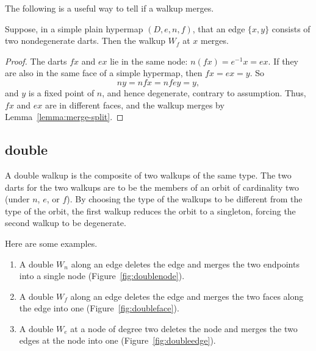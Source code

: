 \figILWHXTE %


The following is a useful way to tell if a walkup merges.


\begin{lemma}\label{lemma:ng-merge}  
Suppose, in a simple plain hypermap $(D,e,n,f)$, that an edge $\{x,y\}$ consists
of two nondegenerate darts.  Then the walkup $W_f$ 
at $x$ merges.
\end{lemma}
%

\begin{proof}
The darts $f x$ and $e x$ lie in the same node: $n (f x) = e^{-1} x
= e x$. If they are also in the same face of a simple hypermap, then
$f x = e x = y$. So
\[ n y = n f x = n f e y = y,\]  and $y$
is a fixed point of $n$, and hence degenerate, contrary to assumption.
Thus, $f x$ and $e x$ are in different faces, and the walkup merges by
Lemma~\ref{lemma:merge-split}.
\end{proof}


\subsection{double}
%

A double walkup is the composite of two walkups of the same type.  The
two darts for the two walkups are to be the members of an orbit of
cardinality two (under $n$, $e$, or $f$).
By choosing the type of the walkups to be different from the type of
the orbit, the first walkup reduces the orbit to a singleton, forcing
the second walkup to be degenerate.

Here are some examples.
\begin{enumerate}\wasitemize 
\item A double $W_n$ along an edge deletes the edge and merges the two
  endpoints into a single node (Figure~\ref{fig:doublenode}).
\item A double $W_f$ along an edge deletes the edge and merges the two
  faces along the edge into one (Figure~\ref{fig:doubleface}).
\item A double $W_e$ at a node of degree two deletes the node and
  merges the two edges at the node into one
  (Figure~\ref{fig:doubleedge}).
\end{enumerate}\wasitemize 

